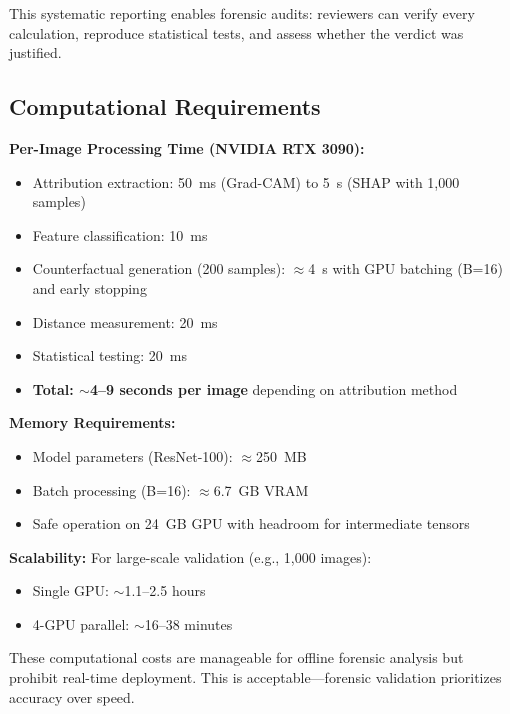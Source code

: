 This systematic reporting enables forensic audits: reviewers can verify every calculation, reproduce statistical tests, and assess whether the verdict was justified.

\subsection{Computational Requirements}

\textbf{Per-Image Processing Time (NVIDIA RTX 3090):}
\begin{itemize}
\item Attribution extraction: 50~ms (Grad-CAM) to 5~s (SHAP with 1,000 samples)
\item Feature classification: 10~ms
\item Counterfactual generation (200 samples): $\approx$4~s with GPU batching (B=16) and early stopping
\item Distance measurement: 20~ms
\item Statistical testing: 20~ms
\item \textbf{Total: $\sim$4--9 seconds per image} depending on attribution method
\end{itemize}

\textbf{Memory Requirements:}
\begin{itemize}
\item Model parameters (ResNet-100): $\approx$250~MB
\item Batch processing (B=16): $\approx$6.7~GB VRAM
\item Safe operation on 24~GB GPU with headroom for intermediate tensors
\end{itemize}

\textbf{Scalability:} For large-scale validation (e.g., 1,000 images):
\begin{itemize}
\item Single GPU: $\sim$1.1--2.5 hours
\item 4-GPU parallel: $\sim$16--38 minutes
\end{itemize}

These computational costs are manageable for offline forensic analysis but prohibit real-time deployment. This is acceptable—forensic validation prioritizes accuracy over speed.
